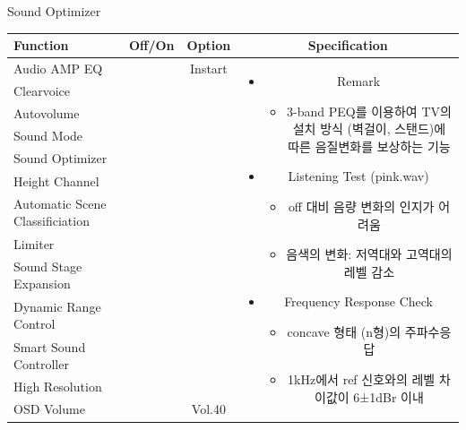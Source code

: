 \documentclass{beamer}
\begin{document}
\begin{frame}[t]{Sound Optimizer}
\begin{tiny}
\begin{tabular}{@{}lccc@{}}
\toprule
Function & Off/On & Option & Specification \\
\midrule
Audio AMP EQ & \color{black}{Off} & Instart &
\multirow{13}{60mm}{
\begin{itemize}
\item Remark
	\begin{itemize}
	\item 3-band PEQ를 이용하여 TV의 설치 방식 (벽걸이, 스탠드)에 따른 음질변화를 보상하는 기능
	\end{itemize}
\item Listening Test (pink.wav)
	\begin{itemize}
	\item off 대비 음량 변화의 인지가 어려움
	\item 음색의 변화: 저역대와 고역대의 레벨 감소
	\end{itemize}
\item Frequency Response Check
  \begin{itemize}
  \item concave 형태 (n형)의 주파수응답
  \item 1kHz에서 ref 신호와의 레벨 차이값이 6±1dBr 이내
  \end{itemize}
\end{itemize}
} \\
Clearvoice & \color{black}{Off} & & \\
Autovolume & \color{black}{Off} & & \\
Sound Mode & \color{black}{Off} & & \\
Sound Optimizer & \color{blue}{On} & & \\
Height Channel & \color{black}{Off} & & \\
Automatic Scene Classificiation & \color{black}{Off} & & \\
Limiter & \color{black}{Off} & & \\
Sound Stage Expansion & \color{black}{Off} & & \\
Dynamic Range Control & \color{black}{Off} & & \\
Smart Sound Controller & \color{black}{Off} & & \\
High Resolution & \color{black}{Off} & & \\
OSD Volume & \color{blue}{On} & Vol.40 & \\
\midrule
\end{tabular}
\end{tiny}


\end{frame}
\end{document}
